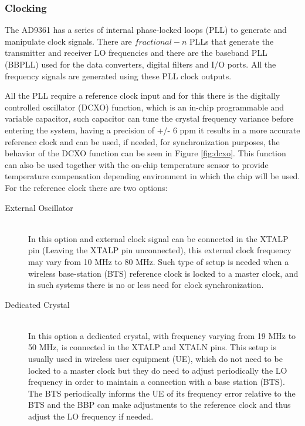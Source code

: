 \subsubsection{Clocking}

The AD9361 has a series of internal phase-locked loops (PLL) to generate and
manipulate clock signals. There are $fractional-n$ PLLs that generate the
transmitter and receiver LO frequencies and there are the baseband PLL (BBPLL)
used for the data converters, digital filters and I/O ports. All the frequency
signals are generated using these PLL clock outputs.

All the PLL require a reference clock input and for this there is the digitally
controlled oscillator (DCXO) function, which is an in-chip programmable and
variable capacitor, such capacitor can tune the crystal frequency variance
before entering the system, having a precision of +/- 6 ppm it results in a more
accurate reference clock and can be used, if needed, for synchronization
purposes, the behavior of the DCXO function can be seen in Figure
\ref{fig:dcxo}. This function can also be used together with the on-chip
temperature sensor to provide temperature compensation depending environment in
which the chip will be used. For the reference clock there are two options:

\begin{description}

	\item[External Oscillator] \hfill \\
	In this option and external clock signal can be connected in the XTALP pin
	(Leaving the XTALP pin unconnected), this external clock frequency may vary
	from 10 MHz to 80 MHz. Such type of setup is needed when a wireless
	base-station (BTS) reference clock is locked to a master clock, and in such
	systems there is no or less need for clock synchronization.

	\item[Dedicated Crystal] \hfill \\
	In this option a dedicated crystal, with frequency varying from 19 MHz to 50
	MHz, is connected in the XTALP and XTALN pins. This setup is usually used in
	wireless user equipment (UE), which do not need to be locked to a master clock
	but they do need to adjust periodically the LO frequency in order to maintain
	a connection with a base station (BTS). The BTS periodically informs the UE of
	its frequency error relative to the BTS and the BBP can make adjustments to
	the reference clock and thus adjust the LO frequency if needed.

\end{description}

